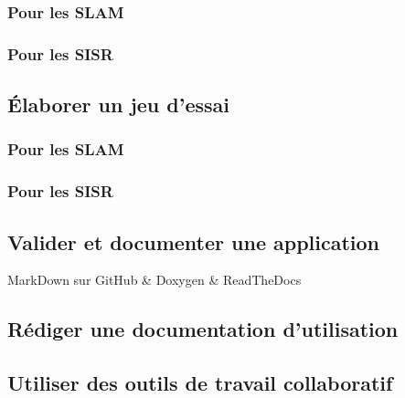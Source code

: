 \documentclass[12pt,a4paper,oneside,titlepage,final]{article}
\begin{document}
\subsubsection{Pour les \gls{SLAM}}
\subsubsection{Pour les \gls{SISR}}

\subsection{Élaborer un jeu d'essai}
\subsubsection{Pour les \gls{SLAM}}
\subsubsection{Pour les \gls{SISR}}

\subsection{Valider et documenter une application}
MarkDown sur GitHub \& Doxygen \& ReadTheDocs

\subsection{Rédiger une documentation d'utilisation}

\subsection{Utiliser des outils de travail collaboratif}



\newpage \printbibheading
\printbibliography[nottype=online,check=notonline,heading=subbibliography,title={Bibliographiques}]
\printbibliography[check=online,heading=subbibliography,title={Webographiques}]

\printglossaries
\end{document}
